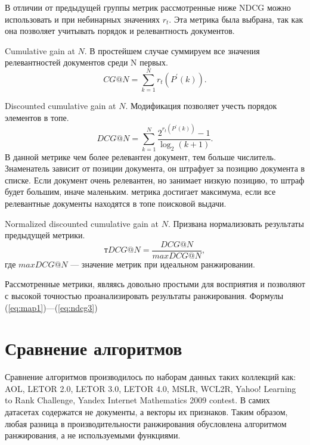 В отличии от предыдущей группы метрик рассмотренные ниже NDCG можно использовать и при небинарных значениях $r_t$. Эта метрика была выбрана, так как она позволяет учитывать порядок и релевантность документов.

Cumulative gain at $N$. В простейшем случае суммируем все значения релевантностей документов среди N первых.
\begin{equation}
	\label{eq:ndcg1}
	CG @ N= \sum_{k=1}^N r_t(P^{\prime}(k)).
\end{equation}

Discounted cumulative gain at $N$. Модификация позволяет учесть порядок элементов в топе.
\begin{equation}
	\label{eq:ndcg2}
	D C G @ N=\sum_{k=1}^N \frac{2^{r_t(P^{\prime}(k))}-1}{\log _2(k+1)}.
\end{equation}
В данной метрике чем более релевантен документ, тем больше числитель. Знаменатель зависит от позиции документа, он штрафует за позицию документа в списке. Если документ очень релевантен, но занимает низкую позицию, то штраф будет большим, иначе маленьким. метрика достигает максимума, если все релевантные документы находятся в топе поисковой выдачи.

Normalized discounted cumulative gain at $N$. Призвана нормализовать результаты предыдущей метрики.
\begin{equation}
	\label{eq:ndcg3}
	тD C G @ N=\frac{D C G @ N}{maxD C G @ N},
\end{equation}
где $maxD C G @ N$ --- значение метрик при идеальном ранжировании.

Рассмотренные метрики, являясь довольно простыми для восприятия и позволяют с высокой точностью проанализировать результаты ранжирования. Формулы (\ref{eq:map1})---(\ref{eq:ndcg3})~\cite{metrics}

\section{Сравнение алгоритмов}

Сравнение алгоритмов производилось по наборам данных таких коллекций как: AOL, LETOR 2.0, LETOR 3.0, LETOR 4.0, MSLR, WCL2R, Yahoo! Learning to Rank Challenge, Yandex Internet Mathematics 2009 contest. В самих датасетах содержатся не документы, а векторы их признаков. Таким образом, любая разница в производительности ранжирования обусловлена алгоритмом ранжирования, а не используемыми функциями.

